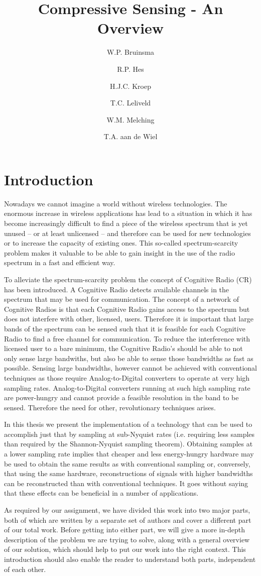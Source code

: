 \documentclass[a4paper, openany, oneside]{memoir}
\title{Compressive Sensing - An Overview}
\author{W.P. Bruinsma \and R.P. Hes \and H.J.C. Kroep \and T.C. Leliveld \and W.M. Melching \and T.A. aan de Wiel}
\begin{document}
\chapter{Introduction}
Nowadays we cannot imagine a world without wireless technologies. The enormous increase in wireless applications has lead to a situation in which it has become increasingly difficult to find a piece of the wireless spectrum that is yet unused -- or at least unlicensed -- and therefore can be used for new technologies or to increase the capacity of existing ones. This so-called spectrum-scarcity problem makes it valuable to be able to gain insight in the use of the radio spectrum in a fast and efficient way.

To alleviate the spectrum-scarcity problem the concept of Cognitive Radio (CR) has been introduced. A Cognitive Radio detects
available channels in the spectrum that may be used for communication. The concept of a network of Cognitive Radios is that each Cognitive Radio gains access to the spectrum but does not interfere with other, licensed, users. Therefore it is important that large bands of the spectrum can be sensed such that it is feasible for each Cognitive Radio to find a free channel for communication. To reduce the interference with licensed user to a bare minimum, the Cognitive Radio's should be able to not only sense large bandwiths, but also be able to sense those bandwidths as fast as possible. Sensing large bandwidths, however cannot be achieved with conventional techniques as those require Analog-to-Digital converters to operate at very high sampling rates. Analog-to-Digital converters running at such high sampling rate are power-hungry and cannot provide a feasible resolution in the band to be sensed. Therefore the need for other, revolutionary techniques arises.

In this thesis we present the implementation of a technology that can be used to accomplish just that by sampling at sub-Nyquist rates (i.e. requiring less samples than required by the Shannon-Nyquist sampling theorem).  Obtaining samples at a lower sampling rate implies that cheaper and less energy-hungry hardware may be used to obtain the same results as with conventional sampling or, conversely, that using the same hardware, reconstructions of signals with higher bandwidths can be reconstructed than with conventional techniques. It goes without saying that these effects can be beneficial in a number of applications.

As required by our assignment, we have divided this work into two major parts, both of which are written by a separate set of authors and cover a different part of our total work. Before getting into either part, we will give a more in-depth description of the problem we are trying to solve, along with a general overview of our solution, which should help to put our work into the right context. This introduction should also enable the reader to understand both parts, independent of each other.
\end{document}

